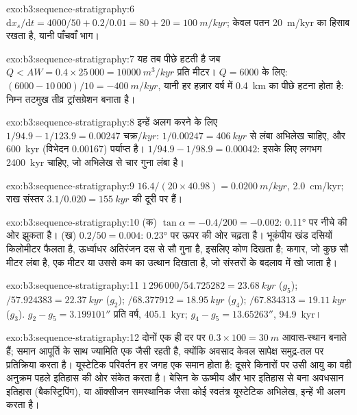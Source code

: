 \begin{solution}{exo:b3:sequence-stratigraphy:6}
$\mathrm dx_s/\mathrm dt = 4000/50 + 0.2/0.01 = 80 + 20 = \qty{100}{m/kyr}$;
केवल पतन \qty{20}{m/kyr} का हिसाब रखता है, यानी पाँचवाँ भाग।
\end{solution}

\begin{solution}{exo:b3:sequence-stratigraphy:7}
यह तब पीछे हटती है जब $Q < AW = 0.4\times25\,000 = \qty{10000}{m^3/kyr}$ प्रति
मीटर। $Q = 6000$ के लिए: $(6000 - 10\,000)/10 = \qty{-400}{m/kyr}$, यानी
हर हज़ार वर्ष में \qty{0.4}{km} का पीछे हटना होता है: निम्न तटमुख
तीव्र ट्रांसग्रेशन बनाता है।
\end{solution}

\begin{solution}{exo:b3:sequence-stratigraphy:8}
इन्हें अलग करने के लिए $1/94.9 - 1/123.9 = \num{0.00247}\text{ चक्र}/\unit{kyr}$:
$1/0.00247 = \qty{406}{kyr}$ से लंबा अभिलेख चाहिए, और \qty{600}{kyr} (विभेदन
0.00167) पर्याप्त है। $1/94.9 - 1/98.9 = 0.00042$: इसके लिए लगभग
\qty{2400}{kyr} चाहिए, जो अभिलेख से चार गुना लंबा है।
\end{solution}

\begin{solution}{exo:b3:sequence-stratigraphy:9}
$16.4/(20\times40.98) = \qty{0.0200}{m/kyr}$, \qty{2.0}{cm/kyr}; राख संस्तर
$3.1/0.020 = \qty{155}{kyr}$ की दूरी पर हैं।
\end{solution}

\begin{solution}{exo:b3:sequence-stratigraphy:10}
(क) $\tan\alpha = -0.4/200 = -0.002$: \ang{0.11} पर नीचे की ओर झुकता है। (ख)
$0.2/50 = 0.004$: \ang{0.23} पर ऊपर की ओर चढ़ता है। भूकंपीय खंड दसियों
किलोमीटर फैलता है, ऊर्ध्वाधर अतिरंजन दस से सौ गुना है, इसलिए कोण दिखता है;
कगार, जो कुछ सौ मीटर लंबा है, एक मीटर या उससे कम का उत्थान दिखाता है, जो
संस्तरों के बदलाव में खो जाता है।
\end{solution}

\begin{solution}{exo:b3:sequence-stratigraphy:11}
$1\,296\,000/54.725282 = \qty{23.68}{kyr}$ ($g_5$); $/57.924383 =
\qty{22.37}{kyr}$ ($g_2$); $/68.377912 = \qty{18.95}{kyr}$ ($g_4$);
$/67.834313 = \qty{19.11}{kyr}$ ($g_3$). $g_2 - g_5 = 3.199101''$ प्रति वर्ष,
\qty{405.1}{kyr}; $g_4 - g_5 = 13.65263''$, \qty{94.9}{kyr}।
\end{solution}

\begin{solution}{exo:b3:sequence-stratigraphy:12}
दोनों एक ही दर पर $0.3\times100 = \qty{30}{m}$ आवास-स्थान बनाते हैं; समान
आपूर्ति के साथ ज्यामिति एक जैसी रहती है, क्योंकि अवसाद केवल सापेक्ष समुद्र-तल
पर प्रतिक्रिया करता है। यूस्टेटिक परिवर्तन हर जगह एक समान होता है: दूसरे
किनारों पर उसी आयु का वही अनुक्रम पहले इतिहास की ओर संकेत करता है। बेसिन
के ऊष्मीय और भार इतिहास से बना अवधसान इतिहास
(बैकस्ट्रिपिंग), या ऑक्सीजन समस्थानिक जैसा कोई स्वतंत्र यूस्टेटिक अभिलेख,
इन्हें भी अलग करता है।
\end{solution}

